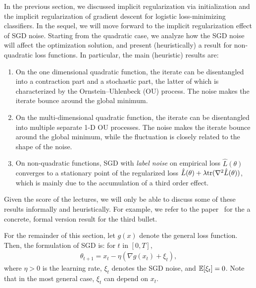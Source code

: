 In the previous section, we discussed implicit regularization via initialization and the implicit regularization of gradient descent for logistic loss-minimizing classifiers. 
In the sequel, we will move forward to the implicit regularization effect of SGD noise. Starting from the quadratic case, we analyze how the SGD noise will affect the optimization solution, and present (heuristically) a result for non-quadratic loss functions. In particular, the main (heuristic) results are:
\begin{enumerate}
\item On the one dimensional quadratic function, the iterate can be disentangled into a contraction part and a stochastic part, the latter of which is characterized by the Ornstein–Uhlenbeck (OU) process. The noise makes the iterate bounce around the global minimum.
\item On the multi-dimensional quadratic function, the iterate can be disentangled into multiple separate 1-D OU processes. The noise makes the iterate bounce around the global minimum, while the fluctuation is closely related to the shape of the noise.
\item On non-quadratic functions, SGD with \textit{label noise} on empirical loss $\hat{L}(\theta)$ converges to a stationary point of the regularized loss $\hat{L}(\theta) + \lambda \textup{tr}(\nabla^2\hat{L}(\theta))$, which is mainly due to the accumulation of a third order effect. 
\end{enumerate}
 
Given the score of the lectures,  we will only be able to discuss some of these results informally and heuristically. For example, we refer to the paper~\citet{damian2021label} for the a concrete, formal version result for the third bullet. 

For the remainder of this section, let $g(x)$ denote the general loss function. Then, the formulation of SGD is: for $t$ in $[0,T]$,
\begin{align}
\theta_{t+1} = x_{t} - \eta(\nabla g(x_{t}) + \xi_t),
\end{align} 
where $\eta > 0$ is the learning rate, $\xi_t$ denotes the SGD noise, and $\operatorname*{\mathbb{E}}[\xi_t] = 0$. Note that in the most general case, $\xi_t$ can depend on $x_t$.
	
